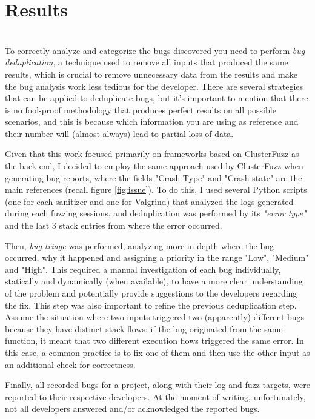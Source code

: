 \chapter{Results} \label{chap_4}
\ \\
To correctly analyze and categorize the bugs discovered you need to perform \textit{bug deduplication}, a technique used to remove all inputs that produced the same results, which is crucial to remove unnecessary data from the results and make the bug analysis work less tedious for the developer. There are several strategies that can be applied to deduplicate bugs, but it's important to mention that there is no fool-proof methodology that produces perfect results on all possible scenarios, and this is because which information you are using as reference and their number will (almost always) lead to partial loss of data.

Given that this work focused primarily on frameworks based on ClusterFuzz as the back-end, I decided to employ the same approach used by ClusterFuzz when generating bug reports, where the fields "Crash Type" and "Crash state" are the main references (recall figure \ref{fig:issue}). To do this, I used several Python scripts (one for each sanitizer and one for Valgrind) that analyzed the logs generated during each fuzzing sessions, and deduplication was performed by its \textit{"error type"} and the last 3 stack entries from where the error occurred.

Then, \textit{bug triage} was performed, analyzing more in depth where the bug occurred, why it happened and assigning a priority in the range "Low", "Medium" and "High". This required a manual investigation of each bug individually, statically and dynamically (when available), to have a more clear understanding of the problem and potentially provide suggestions to the developers regarding the fix.
This step was also important to refine the previous deduplication step.  Assume the situation where two inputs triggered two (apparently) different bugs because they have distinct stack flows: if the bug originated from the same function, it meant that two different execution flows triggered the same error. In this case, a common practice is to fix one of them and then use the other input as an additional check for correctness.

Finally, all recorded bugs for a project, along with their log and fuzz targets, were reported to their respective developers.
At the moment of writing, unfortunately, not all developers answered and/or acknowledged the reported bugs.




